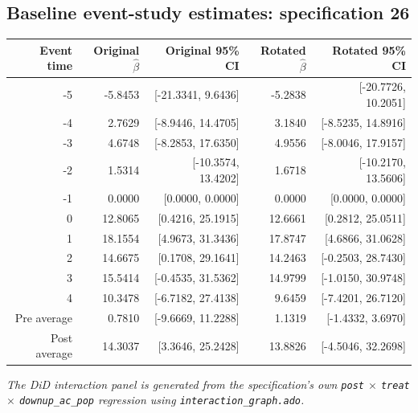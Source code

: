 \documentclass[10pt]{article}
\begin{document}
\subsection*{Baseline event-study estimates: specification 26}
\begin{center}
\scriptsize
\begin{tabular}{r rr rr}
\toprule
Event time & Original $\hat\beta$ & Original 95\% CI & Rotated $\hat\beta$ & Rotated 95\% CI \\
\midrule
-5 & -5.8453 & [-21.3341, 9.6436] & -5.2838 & [-20.7726, 10.2051] \\
-4 & 2.7629 & [-8.9446, 14.4705] & 3.1840 & [-8.5235, 14.8916] \\
-3 & 4.6748 & [-8.2853, 17.6350] & 4.9556 & [-8.0046, 17.9157] \\
-2 & 1.5314 & [-10.3574, 13.4202] & 1.6718 & [-10.2170, 13.5606] \\
-1 & 0.0000 & [0.0000, 0.0000] & 0.0000 & [0.0000, 0.0000] \\
0 & 12.8065 & [0.4216, 25.1915] & 12.6661 & [0.2812, 25.0511] \\
1 & 18.1554 & [4.9673, 31.3436] & 17.8747 & [4.6866, 31.0628] \\
2 & 14.6675 & [0.1708, 29.1641] & 14.2463 & [-0.2503, 28.7430] \\
3 & 15.5414 & [-0.4535, 31.5362] & 14.9799 & [-1.0150, 30.9748] \\
4 & 10.3478 & [-6.7182, 27.4138] & 9.6459 & [-7.4201, 26.7120] \\
\midrule
Pre average & 0.7810 & [-9.6669, 11.2288] & 1.1319 & [-1.4332, 3.6970] \\
Post average & 14.3037 & [3.3646, 25.2428] & 13.8826 & [-4.5046, 32.2698] \\
\bottomrule
\end{tabular}
\end{center}
\medskip
\textit{The DiD interaction panel is generated from the specification's own \texttt{post} $\times$ \texttt{treat} $\times$ \texttt{downup\_ac\_pop} regression using \texttt{interaction\_graph.ado}.}
\clearpage
\end{document}
